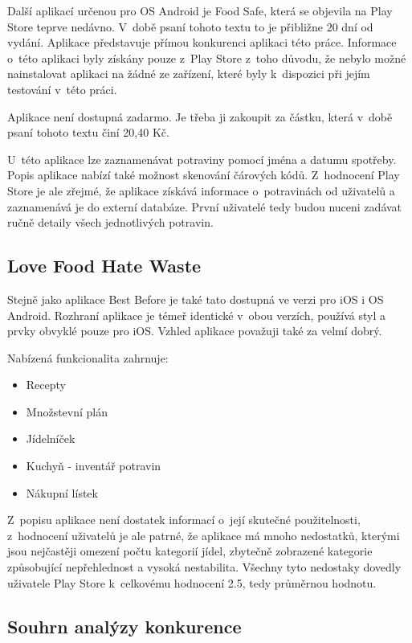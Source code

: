 \documentclass[thesis=B,czech]{FITthesis}[2013/10/20]
\begin{document}
Další aplikací určenou pro OS Android je Food Safe, která se objevila na Play Store teprve nedávno. V~době psaní tohoto textu to je přibližne 20 dní od vydání. Aplikace představuje přímou konkurenci aplikaci této práce. Informace o~této aplikaci byly získány pouze z~Play Store z~toho důvodu, že nebylo možné nainstalovat aplikaci na žádné ze zařízení, které byly k~dispozici při jejím testování v~této práci. 

Aplikace není dostupná zadarmo. Je třeba ji zakoupit za částku, která v~době psaní tohoto textu činí 20,40 Kč.

U~této aplikace lze zaznamenávat potraviny pomocí jména a datumu spotřeby. Popis aplikace nabízí také možnost skenování čárových kódů. Z~hodnocení Play Store je ale zřejmé, že aplikace získává informace o~potravinách od uživatelů a zaznamenává je do externí databáze. První uživatelé tedy budou nuceni zadávat ručně detaily všech jednotlivých potravin.

\subsection{Love Food Hate Waste}

Stejně jako aplikace Best Before je také tato dostupná ve verzi pro iOS i OS Android. Rozhraní aplikace je témeř identické v~obou verzích, používá styl a prvky obvyklé pouze pro iOS. Vzhled aplikace považuji také za velmí dobrý.

Nabízená funkcionalita zahrnuje:
\begin{itemize}
  \item{Recepty}
  \item{Množstevní plán}
  \item{Jídelníček}
  \item{Kuchyň - inventář potravin}
  \item{Nákupní lístek}
\end{itemize}

Z~popisu aplikace není dostatek informací o~její skutečné použitelnosti, z~hodnocení uživatelů je ale patrné, že aplikace má mnoho nedostatků, kterými jsou nejčastěji omezení počtu kategorií jídel, zbytečně zobrazené kategorie způsobující nepřehlednost a vysoká nestabilita. Všechny tyto nedostaky dovedly uživatele Play Store k~celkovému hodnocení 2.5, tedy průměrnou hodnotu.

\subsection{Souhrn analýzy konkurence}
\end{document}
